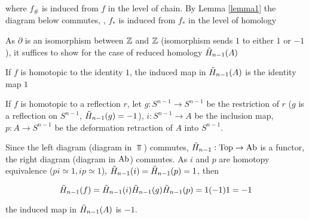 \documentclass{article}
\begin{document}
where $f_\#$ is induced from $f$ in the level of chain. By Lemma \ref{lemma1} the diagram below commutes, , $f_*$ is induced from $f_*$ in the level of homology

\begin{center}
\end{center}

As $\partial$ is an isomorphism between $\mathbb{Z}$ and $\mathbb{Z}$ (isomorphism sends $1$ to either $1$ or $-1$), it suffices to show for the case of reduced homology $\Tilde{H}_{n-1}(A)$

\begin{longproof}
    If $f$ is homotopic to the identity $1$, the induced map in $\Tilde{H}_{n-1}(A)$ is the identity map $1$
    
    If $f$ is homotopic to a reflection $r$, let $g: S^{n-1} \to S^{n-1}$ be the restriction of $r$ ($g$ is a reflection on $S^{n-1}$, $\Tilde{H}_{n-1}(g) = -1$), $i: S^{n-1} \to A$ be the inclusion map, $p: A \to S^{n-1}$ be the deformation retraction of $A$ into $S^{n-1}$.
    
    \begin{center}
    \end{center}
    
    Since the left diagram (diagram in $\Top$) commutes, $\Tilde{H}_{n-1}: \operatorname{Top} \to \operatorname{Ab}$ is a functor, the right diagram (diagram in $\operatorname{Ab}$) commutes. As $i$ and $p$ are homotopy equivalence ($p i \simeq 1, i p \simeq 1$), $\Tilde{H}_{n-1}(i) = \Tilde{H}_{n-1}(p) = 1$, then 
    
    $$
        \Tilde{H}_{n-1}(f) = \Tilde{H}_{n-1}(i) \Tilde{H}_{n-1}(g) \Tilde{H}_{n-1}(p) = 1 (-1) 1 = -1
    $$

    the induced map in $\Tilde{H}_{n-1}(A)$ is $-1$.
\end{longproof}
\end{document}

